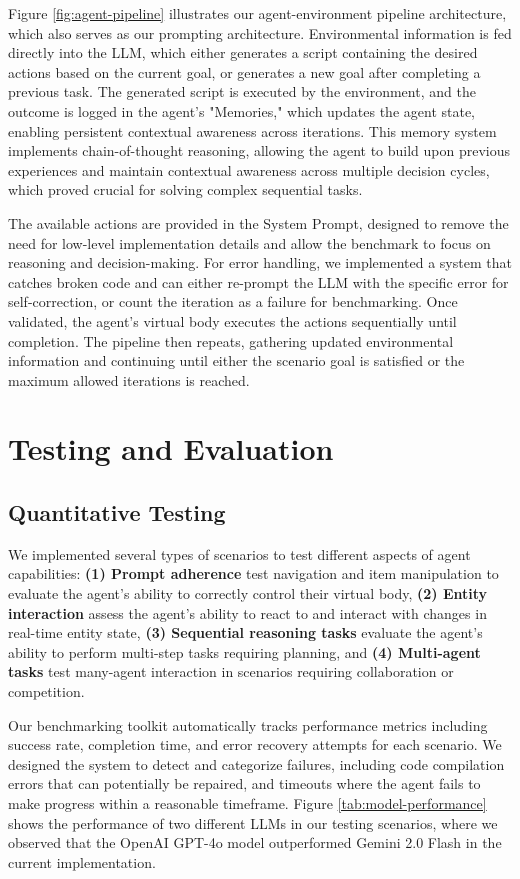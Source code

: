 \documentclass{article}
\begin{document}
Figure \ref{fig:agent-pipeline} illustrates our agent-environment pipeline architecture, which also serves as our prompting architecture.
Environmental information is fed directly into the LLM, which either generates a script containing the desired actions based on the current goal, or generates a new goal after completing a previous task.
The generated script is executed by the environment, and the outcome is logged in the agent's "Memories," which updates the agent state, enabling persistent contextual awareness across iterations. This memory system implements chain-of-thought reasoning, allowing the agent to build upon previous experiences and maintain contextual awareness across multiple decision cycles, which proved crucial for solving complex sequential tasks.

The available actions are provided in the System Prompt, designed to remove the need for low-level implementation details and allow the benchmark to focus on reasoning and decision-making.
For error handling, we implemented a system that catches broken code and can either re-prompt the LLM with the specific error for self-correction, or count the iteration as a failure for benchmarking.
Once validated, the agent's virtual body executes the actions sequentially until completion. 
The pipeline then repeats, gathering updated environmental information and continuing until either the scenario goal is satisfied or the maximum allowed iterations is reached.

\section{Testing and Evaluation}
\subsection{Quantitative Testing}
We implemented several types of scenarios to test different aspects of agent capabilities:
\textbf{(1) Prompt adherence} test navigation and item manipulation to evaluate the agent's ability to correctly control their virtual body,
\textbf{(2) Entity interaction} assess the agent's ability to react to and interact with changes in real-time entity state,
\textbf{(3) Sequential reasoning tasks} evaluate the agent's ability to perform multi-step tasks requiring planning, and
\textbf{(4) Multi-agent tasks} test many-agent interaction in scenarios requiring collaboration or competition.

Our benchmarking toolkit automatically tracks performance metrics including success rate, completion time, and error recovery attempts for each scenario. 
We designed the system to detect and categorize failures, including code compilation errors that can potentially be repaired, and timeouts where the agent fails to make progress within a reasonable timeframe.
Figure \ref{tab:model-performance} shows the performance of two different LLMs in our testing scenarios, where we observed that the OpenAI GPT-4o model outperformed Gemini 2.0 Flash in the current implementation.
\end{document}
